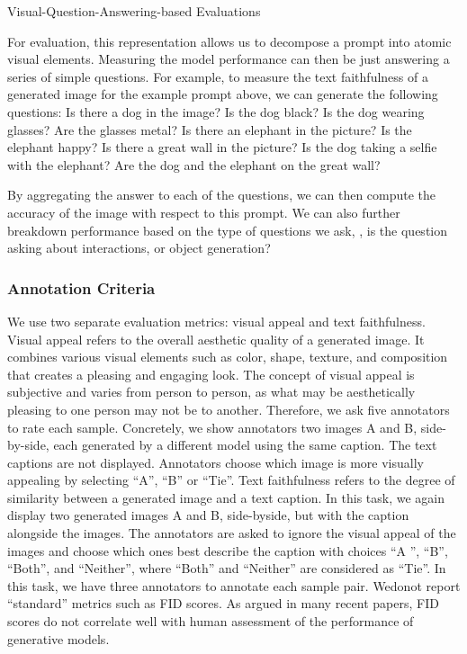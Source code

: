 Visual-Question-Answering-based Evaluations

For evaluation, this representation allows us to decompose a prompt into atomic visual elements. Measuring the model performance can then be just answering a series of simple questions. For example, to measure the text faithfulness of a generated image for the example prompt above, we can generate the following questions:
Is there a dog in the image?
Is the dog black?
Is the dog wearing glasses?
Are the glasses metal?
Is there an elephant in the picture?
Is the elephant happy?
Is there a great wall in the picture?
Is the dog taking a selfie with the elephant?
Are the dog and the elephant on the great wall?

By aggregating the answer to each of the questions, we can then compute the accuracy of the image with respect to this prompt. We can also further breakdown performance based on the type of questions we ask, \ie, is the question asking about interactions, or object generation?









\subsubsection{Annotation Criteria}
We use two separate evaluation metrics: visual appeal and text faithfulness. Visual appeal refers to the overall aesthetic quality of a generated image. It combines various visual elements such as color, shape, texture, and composition that creates a pleasing and engaging look. The concept of visual appeal is subjective and varies from person to person, as what may be aesthetically pleasing to one person may not be to another. Therefore, we ask five annotators to rate each sample. Concretely, we show annotators two images A and B, side-by-side, each generated by a different model using the same caption. The text captions are not displayed. Annotators choose which image is more visually appealing by selecting “A”, “B” or “Tie”. Text faithfulness refers to the degree of similarity between a generated image and a text caption. In this task, we again display two generated images A and B, side-byside, but with the caption alongside the images. The annotators are asked to ignore the visual appeal of the images and choose which ones best describe the caption with choices “A ”, “B”, “Both”, and “Neither”, where “Both” and “Neither” are considered as “Tie”. In this task, we have three annotators to annotate each sample pair. Wedonot report “standard” metrics such as FID scores. As argued in many recent papers, FID scores do not correlate well with human assessment of the performance of generative models.

